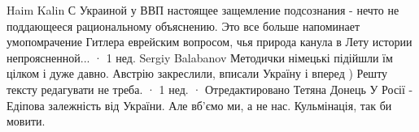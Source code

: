  
 
 
 
 
\zzSecCmt

\begin{itemize} %
Haim Kalin
С Украиной у ВВП настоящее защемление подсознания - нечто не поддающееся рациональному объяснению. Это все больше напоминает умопомрачение Гитлера еврейским вопросом, чья природа канула в Лету истории непроясненной...
 · 1 нед.
Sergiy Balabanov
Методички німецькі підійшли їм цілком і дуже давно. Австрію закреслили, вписали Україну і вперед ) Решту тексту редагувати не треба.
 · 1 нед. · Отредактировано
Тетяна Донець
У Росії - Едіпова залежність від України. Але вб'ємо ми, а не нас. Кульмінація, так би мовити.
\end{itemize} %
